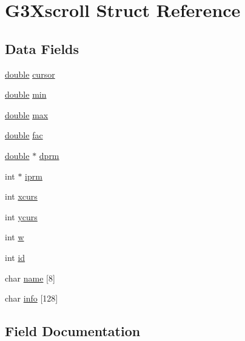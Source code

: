 \hypertarget{struct_g3_xscroll}{}\section{G3\+Xscroll Struct Reference}
\label{struct_g3_xscroll}
\subsection*{Data Fields}
\begin{DoxyCompactItemize}
\item 
\hyperlink{g3x__transfo_8h_a89b2b23e407882a535d835574a7912e1}{double} \hyperlink{struct_g3_xscroll_aac2416dd901b6711b49b1bad640462fa}{cursor}
\item 
\hyperlink{g3x__transfo_8h_a89b2b23e407882a535d835574a7912e1}{double} \hyperlink{struct_g3_xscroll_aad36546e8175d2922bee165fe028fedc}{min}
\item 
\hyperlink{g3x__transfo_8h_a89b2b23e407882a535d835574a7912e1}{double} \hyperlink{struct_g3_xscroll_a0b0ede69e8156eb97acc579b88e883de}{max}
\item 
\hyperlink{g3x__transfo_8h_a89b2b23e407882a535d835574a7912e1}{double} \hyperlink{struct_g3_xscroll_ae061d397826cfa2de10dbf4d39e45c2b}{fac}
\item 
\hyperlink{g3x__transfo_8h_a89b2b23e407882a535d835574a7912e1}{double} $\ast$ \hyperlink{struct_g3_xscroll_a6e0310455a4985ffbf39653fdee20a8a}{dprm}
\item 
int $\ast$ \hyperlink{struct_g3_xscroll_ac10925eeb681dafd5c6761bd51b25eca}{iprm}
\item 
int \hyperlink{struct_g3_xscroll_a924c1eb707e0db1173fe6a04f2ac67d4}{xcurs}
\item 
int \hyperlink{struct_g3_xscroll_a8a7bbcc9998fba42cea9ea3803cd99d4}{ycurs}
\item 
int \hyperlink{struct_g3_xscroll_aac374e320caaadeca4874add33b62af2}{w}
\item 
int \hyperlink{struct_g3_xscroll_a7441ef0865bcb3db9b8064dd7375c1ea}{id}
\item 
char \hyperlink{struct_g3_xscroll_aaf1bd07e95aeff0f585394fccaf479ab}{name} \mbox{[}8\mbox{]}
\item 
char \hyperlink{struct_g3_xscroll_aef383a8ccd6a48889b57cb6ceb7091f6}{info} \mbox{[}128\mbox{]}
\end{DoxyCompactItemize}


\subsection{Field Documentation}
\mbox{\label{struct_g3_xscroll_aac2416dd901b6711b49b1bad640462fa}} 
